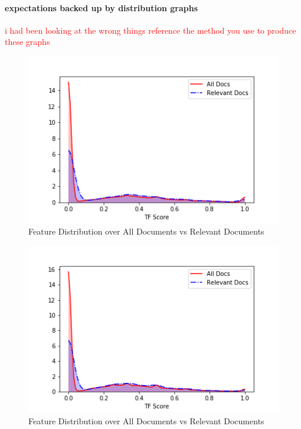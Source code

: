 \documentclass{mpaper}
\newcommand{\remove}[1]{\textcolor{red}{#1}}
\begin{document}
\paragraph{expectations backed up by distribution graphs}
\remove{i had been looking at the wrong things}
\remove{reference the method you use to produce these graphs}
\begin{figure}[H]
\begin{center}
\includegraphics[scale=0.5]{persons.png}
\end{center}
\caption{\label{fig:distribution} Feature Distribution over All Documents vs Relevant Documents}
\end{figure}
\begin{figure}[H]
\begin{center}
\includegraphics[scale=0.5]{orgs.png}
\end{center}
\caption{\label{fig:distribution} Feature Distribution over All Documents vs Relevant Documents}
\end{figure}
\end{document}
